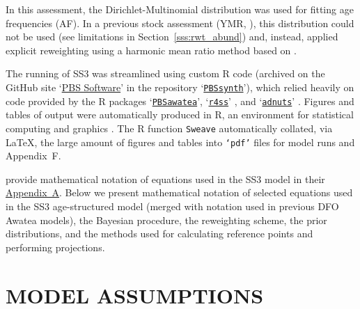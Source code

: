 \documentclass[11pt]{book}
\newcommand{\code}[1]{\normalsize\texttt{#1}\normalsize}%
\newcommand{\AppRes}{Appendix~F}
\begin{document}
In this assessment, the Dirichlet-Multinomial distribution was used for fitting age frequencies (AF).
In a previous stock assessment (YMR, \citealt{DFO-SAR:2022_ymr}), this distribution could not be used (see limitations in Section~\ref{sss:rwt_abund}) and, instead, applied explicit reweighting using a harmonic mean ratio method based on \citet{McAllister-Ianelli:1997}.

The running of SS3 was streamlined using custom R code (archived on the GitHub site `\href{https://github.com/pbs-software}{PBS Software}' in the repository `\href{https://github.com/pbs-software/pbs-synth}{\code{PBSsynth}}'), which relied heavily on code provided by the R packages `\href{https://github.com/pbs-software/pbs-awatea}{\code{PBSawatea}}', `\href{https://github.com/r4ss/r4ss}{\code{r4ss}}' \citep{R:2020_r4ss}, and `\href{https://github.com/Cole-Monnahan-NOAA/adnuts}{\code{adnuts}}' \citep{R:2018_adnuts}.
Figures and tables of output were automatically produced in R, an environment for statistical computing and graphics \citep{R:2021_base}. 
The R function \code{Sweave} \citep{Leisch:2002} automatically collated, via \LaTeX, the large amount of figures and tables into \code{`pdf'} files for model runs and \AppRes.

\citet{Methot-Wetzel:2013} provide mathematical notation of equations used in the SS3 model in their \href{https://sedarweb.org/docs/wsupp/S39_RD_08_Methot_and_Wetzel_2013_Fish_Res_App_A.pdf}{Appendix~A}.
Below we present mathematical notation of selected equations used in the SS3 age-structured model (merged with notation used in previous DFO Awatea models), the Bayesian procedure, the reweighting scheme, the prior distributions, and the methods used for calculating reference points and performing projections.

\section{MODEL ASSUMPTIONS}
\end{document}
